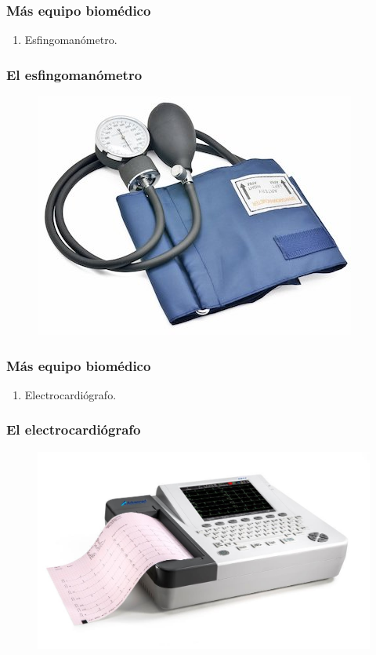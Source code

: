 \documentclass[14pt]{beamer}
\begin{document}
\begin{frame}
\frametitle{Más equipo biomédico}
\begin{enumerate}[<+->]
\item Esfingomanómetro.
\seti
\end{enumerate}
\end{frame}
\begin{frame}
\frametitle{El esfingomanómetro}
\vspace*{-1cm}
\begin{figure}
    \centering
    \includegraphics[scale=0.5]{Imagenes/Instrumentacion_08.jpg}
\end{figure}
\end{frame}
\begin{frame}
\frametitle{Más equipo biomédico}
\begin{enumerate}[<+->]
\conti
\item Electrocardiógrafo.
\seti
\end{enumerate}
\end{frame}
\begin{frame}
\frametitle{El electrocardiógrafo}
\vspace*{-1cm}
\begin{figure}
    \centering
    \includegraphics[scale=0.3]{Imagenes/Instrumentacion_09.jpg}
\end{figure}
\end{frame}
\end{document}
